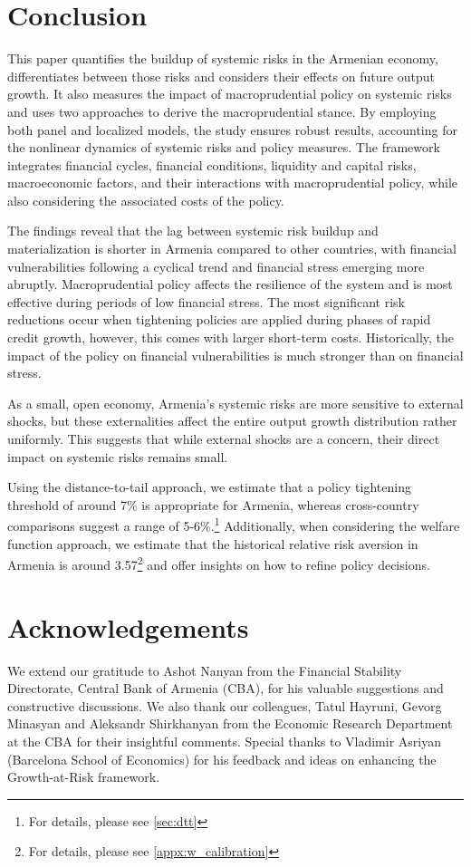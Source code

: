 \documentclass[12pt,a4paper]{article}
\begin{document}
\section{Conclusion}
This paper quantifies the buildup of systemic risks in the Armenian economy, differentiates between those risks and considers their effects on future output growth. It also measures the impact of macroprudential policy on systemic risks and uses two approaches to derive the macroprudential stance. By employing both panel and localized models, the study ensures robust results, accounting for the nonlinear dynamics of systemic risks and policy measures. The framework integrates financial cycles, financial conditions, liquidity and capital risks, macroeconomic factors, and their interactions with macroprudential policy, while also considering the associated costs of the policy.

The findings reveal that the lag between systemic risk buildup and materialization is shorter in Armenia compared to other countries, with financial vulnerabilities following a cyclical trend and financial stress emerging more abruptly. Macroprudential policy affects the resilience of the system and is most effective during periods of low financial stress. The most significant risk reductions occur when tightening policies are applied during phases of rapid credit growth, however, this comes with larger short-term costs. Historically, the impact of the policy on financial vulnerabilities is much stronger than on financial stress.

As a small, open economy, Armenia's systemic risks are more sensitive to external shocks, but these externalities affect the entire output growth distribution rather uniformly. This suggests that while external shocks are a concern, their direct impact on systemic risks remains small.

Using the distance-to-tail approach, we estimate that a policy tightening threshold of around 7\% is appropriate for Armenia, whereas cross-country comparisons suggest a range of 5-6\%.\footnote{For details, please see \autoref{sec:dtt}} Additionally, when considering the welfare function approach, we estimate that the historical relative risk aversion in Armenia is around 3.57\footnote{For details, please see \ref{appx:w_calibration}} and offer insights on how to refine policy decisions.


\section*{Acknowledgements}
We extend our gratitude to Ashot Nanyan from the Financial Stability Directorate, Central Bank of Armenia (CBA), for his valuable suggestions and constructive discussions. We also thank our colleagues, Tatul Hayruni, Gevorg Minasyan and Aleksandr Shirkhanyan from the Economic Research Department at the CBA for their insightful comments. Special thanks to Vladimir Asriyan (Barcelona School of Economics) for his feedback and ideas on enhancing the Growth-at-Risk framework.
\end{document}
